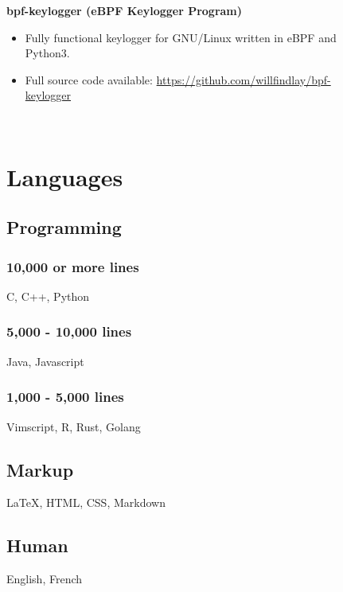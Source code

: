 \documentclass[
    10pt,
]
{article}
\begin{document}
\begin{figure}
\begin{minipage}[t]{0.65\textwidth}
\color{black}
\textbf{bpf-keylogger (eBPF Keylogger Program)}
\color{gray}
\begin{itemize}[itemsep=0em]
    \item Fully functional keylogger for GNU/Linux written in eBPF and Python3.
    \item Full source code available: \url{https://github.com/willfindlay/bpf-keylogger}
\end{itemize}

\end{minipage}
\hfill
\begin{minipage}[t]{0.32\textwidth}
\color{gray}
\ %
\vspace{-3.75em}

\section{Languages}

\subsection{Programming}

\subsubsection{10,000 or more lines}

C, C++, Python

\subsubsection{5,000 - 10,000 lines}

Java, Javascript

\subsubsection{1,000 - 5,000 lines}

Vimscript, R, Rust, Golang

\subsection{Markup}

\LaTeX, HTML, CSS, Markdown

\subsection{Human}

English, French


\end{minipage}
\end{figure}
\end{document}
